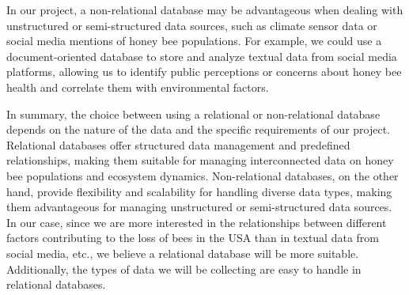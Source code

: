\documentclass[
  letterpaper,
  DIV=11,
  numbers=noendperiod]{scrartcl}
\begin{document}
In our project, a non-relational database may be advantageous when
dealing with unstructured or semi-structured data sources, such as
climate sensor data or social media mentions of honey bee populations.
For example, we could use a document-oriented database to store and
analyze textual data from social media platforms, allowing us to
identify public perceptions or concerns about honey bee health and
correlate them with environmental factors.

In summary, the choice between using a relational or non-relational
database depends on the nature of the data and the specific requirements
of our project. Relational databases offer structured data management
and predefined relationships, making them suitable for managing
interconnected data on honey bee populations and ecosystem dynamics.
Non-relational databases, on the other hand, provide flexibility and
scalability for handling diverse data types, making them advantageous
for managing unstructured or semi-structured data sources. In our case,
since we are more interested in the relationships between different
factors contributing to the loss of bees in the USA than in textual data
from social media, etc., we believe a relational database will be more
suitable. Additionally, the types of data we will be collecting are easy
to handle in relational databases.
\end{document}
